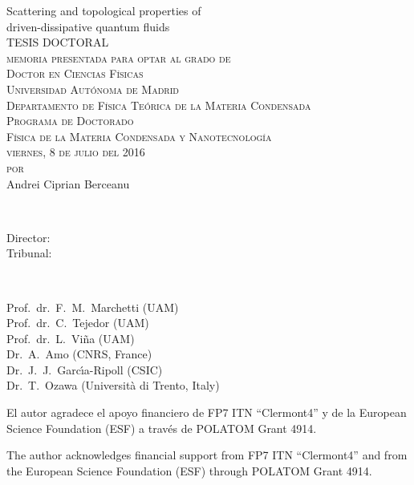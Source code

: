 \thispagestyle{empty}

\begin{center}
{\Huge  Scattering and topological properties of \\ driven-dissipative quantum fluids\\}
\vspace{5.4cm}
{\large{TESIS DOCTORAL}}\\
\vspace{2.6cm}
{ \textsc{memoria presentada para optar al grado de \\ Doctor en Ciencias F\'{i}sicas\\
Universidad Aut\'{o}noma de Madrid\\
Departamento de F\'{i}sica Te\'{o}rica de la Materia Condensada\\
Programa de Doctorado\\
F\'{i}sica de la Materia Condensada y Nanotecnolog\'{i}a\\
viernes, 8 de julio del 2016\\
$\,$\\$\,$\\por\\$\,$\\$\,$\\}
{\LARGE{Andrei Ciprian Berceanu}}}
\end{center}
\newpage

\thispagestyle{empty}
\\[2ex]
  \parbox[t]{2.8cm}{Director:\\
                  Tribunal:
}~\parbox[t]{9cm}{Prof.\ dr.\ F.\ M.\ Marchetti (UAM) \\
Prof.\ dr.\ C.\ Tejedor (UAM) \\
Prof.\ dr.\ L.\ Vi\~{n}a (UAM) \\
Dr.\ A.\ Amo (CNRS, France) \\
Dr.\ J.\ J.\ Garc\'{\i}a-Ripoll (CSIC) \\
Dr.\ T.\ Ozawa (Universit\`{a} di Trento, Italy)
}


\vfill


\noindent
\begin{otherlanguage}{spanish}
El autor agradece el apoyo financiero de FP7 ITN ``Clermont4'' y
de la European Science Foundation (ESF) a trav\'{e}s de POLATOM Grant 4914.
\end{otherlanguage}
\vspace{\baselineskip}


\noindent
The author acknowledges financial support from FP7 ITN ``Clermont4'' and
from the European Science Foundation (ESF) through POLATOM Grant 4914.
\vspace{\baselineskip}


